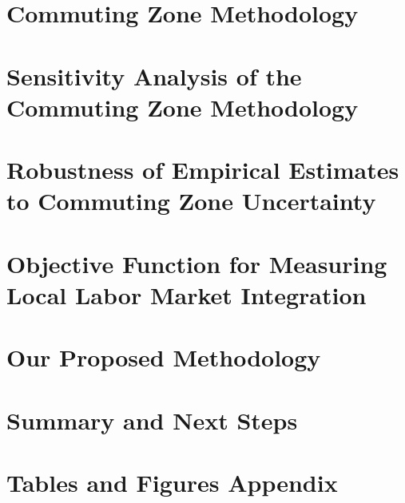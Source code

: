 \documentclass[12pt]{article}
\begin{document}



\section{Commuting Zone Methodology \label{sec:definitions}}




\section{Sensitivity Analysis of the Commuting Zone Methodology \label{sec:issues}}




\section{Robustness of Empirical Estimates to Commuting Zone Uncertainty \label{sec:adhreplication}}




\section{Objective Function for Measuring Local Labor Market Integration \label{sec:objfn}}




\section{Our Proposed Methodology \label{sec:ourmeth}}




\section{Summary and Next Steps \label{sec:conclusion}}


	

\clearpage
\singlespacing




\newpage
\appendix
\section*{Tables and Figures Appendix}
\FloatBarrier


\end{document}
